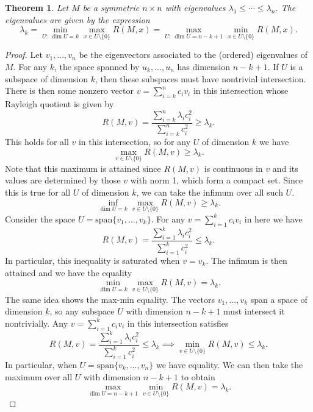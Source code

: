 \documentclass[11pt,letterpaper]{article}
\newcommand{\spn}{\text{span}}
\newtheorem{theorem}{Theorem}[section]
\theoremstyle{definition}
\theoremstyle{remark}
\begin{document}
\begin{theorem}
	Let $M$ be a symmetric $n\times n$ with eigenvalues $\lambda_1 \leq \cdots \leq \lambda_n$. The eigenvalues are given by the expression
	\[
	\lambda_k = \min_{U:\ \dim U = k}\max_{x\in U\setminus \{0\}}R(M, x) = \max_{U:\ \dim U = n-k+1}\min_{x\in U\setminus \{0\}}R(M, x).
	\]
\end{theorem}
\begin{proof}
	Let $v_1, \ldots, v_n$ be the eigenvectors associated to the (ordered) eigenvalues of $M$. For any $k$, the space spanned by $u_k, \ldots, u_n$ has dimension $n-k+1$. If $U$ is a subspace of dimension $k$, then these subspaces must have nontrivial intersection. There is then some nonzero vector $v = \sum_{i=k}^n c_iv_i$ in this intersection whose Rayleigh quotient is given by
	\[
	R(M, v) = \frac{\sum_{i=k}^n\lambda_ic_i^2}{\sum_{i=k}^nc_i^2}\geq \lambda_k.
	\]
	This holds for all $v$ in this intersection, so for any $U$ of dimension $k$ we have
	\[
	\max_{v\in U\setminus \{0\}}R(M, v)\geq \lambda_k.
	\]
	Note that this maximum is attained since $R(M, v)$ is continuous in $v$ and its values are determined by those $v$ with norm 1, which form a compact set. Since this is true for all $U$ of dimension $k$, we can take the infimum over all such $U$.
	\[
	\inf_{\dim U = k}\max_{v\in U\setminus \{0\}}R(M, v)\geq \lambda_k.
	\]
	Consider the space $U = \spn\{v_1, \ldots, v_k\}$. For any $v = \sum_{i=1}^kc_iv_i$ in here we have
	\[
	R(M, v) = \frac{\sum_{i=1}^k\lambda_ic_i^2}{\sum_{i=1}^kc_i^2} \leq \lambda_k.
	\]
	In particular, this inequality is saturated when $v = v_k$. The infimum is then attained and we have the equality
	\[
	\min_{\dim U = k}\max_{v\in U\setminus \{0\}}R(M, v) = \lambda_k.
	\]
	The same idea shows the max-min equality. The vectors $v_1, \ldots, v_k$ span a space of dimension $k$, so any subspace $U$ with dimension $n-k+1$ must intersect it nontrivially. Any $v = \sum_{i=1}^kc_iv_i$ in this intersection satisfies
	\[
	R(M, v) = \frac{\sum_{i = 1}^k\lambda_ic_i^2}{\sum_{i=1}^kc_i^2} \leq \lambda_k \implies \min_{v\in U\setminus\{0\}}R(M, v)\leq \lambda_k.
	\]
	In particular, when $U = \spn\{v_k, \ldots, v_n\}$ we have equality. We can then take the maximum over all $U$ with dimension $n-k+1$ to obtain
	\[
	\max_{\dim U = n-k+1}\min_{v\in U\setminus\{0\}}R(M, v) = \lambda_k.
	\]
\end{proof}
\end{document}
